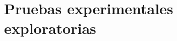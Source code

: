 \documentclass[11pt]{report}
\begin{document}



\section{Pruebas experimentales exploratorias} 
\end{document}

